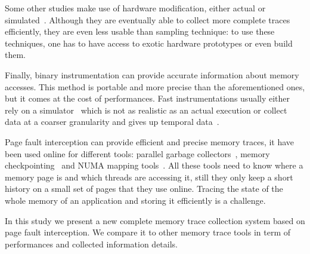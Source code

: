 Some other studies make use of hardware modification, either actual or
simulated~\cite{Bao08HMTT,Martonosi92MemSpy}.  Although they are eventually able to collect
more complete traces efficiently, they are even less usable than sampling technique: to use
these techniques, one has to have access to exotic hardware prototypes or even build them.

Finally, binary instrumentation can provide accurate information about memory accesses.
This method is portable and  more precise than the aforementioned ones,
but it comes at the cost of performances. Fast
instrumentations usually either rely on a simulator~\cite{DeRose02SIGMA} which is not as realistic as an actual execution
or collect data at a coarser granularity and gives up temporal
data~\cite{Beniamine15TABARNAC}.


Page fault interception can provide efficient and precise memory traces, it
have been used online for different tools: parallel garbage
collectors~\cite{Boehm91Mostly}, memory
checkpointing~\cite{Heo05Spaceefficient} and NUMA mapping
tools~\cite{Diener13CommunicationBased}. All these tools need to know where a
memory page is and which threads are accessing it, still they only keep a
short history on a small set of pages that they use online. Tracing the state
of the whole memory of an application and storing it efficiently is a
challenge.

In this study we present a new complete memory trace collection system based on page
fault interception. We compare it to other memory trace tools in term of
performances and collected information details.
